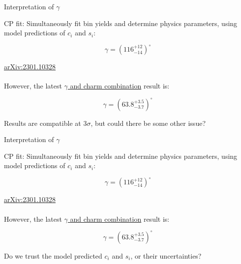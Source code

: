 \documentclass{beamer}
\begin{document}
\begin{frame}{Interpretation of $\gamma$}
  \begin{center}
    \Large CP fit: Simultaneously fit bin yields and determine physics parameters, using model predictions of $c_i$ and $s_i$:
  \end{center}
  \begin{equation*}
    \gamma = (116^{+12}_{-14})^\circ
  \end{equation*}
  \begin{center}
    \tiny \href{https://arxiv.org/abs/2301.10328}{arXiv:2301.10328}\\~\\
    \large However, the latest \href{https://cds.cern.ch/record/2838029}{$\gamma$ and charm combination} result is:
  \end{center}
  \begin{equation*}
    \gamma = (63.8^{+3.5}_{-3.7})^\circ
  \end{equation*}
  \begin{center}
    \large Results are compatible at $3\sigma$, but could there be some other issue?
  \end{center}  
\end{frame}

\begin{frame}{Interpretation of $\gamma$}
  \begin{center}
    \Large CP fit: Simultaneously fit bin yields and determine physics parameters, using model predictions of $c_i$ and $s_i$:
  \end{center}
  \begin{equation*}
    \gamma = (116^{+12}_{-14})^\circ
  \end{equation*}
  \begin{center}
    \tiny \href{https://arxiv.org/abs/2301.10328}{arXiv:2301.10328}\\~\\
    \large However, the latest \href{https://cds.cern.ch/record/2838029}{$\gamma$ and charm combination} result is:
  \end{center}
  \begin{equation*}
    \gamma = (63.8^{+3.5}_{-3.7})^\circ
  \end{equation*}
  \begin{center}
    \large Do we trust the model predicted $c_i$ and $s_i$, or their uncertainties?
  \end{center}  
\end{frame}
\end{document}
